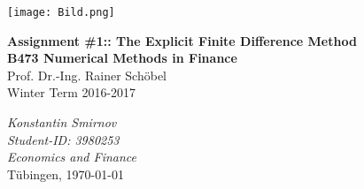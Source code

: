 \documentclass[a4paper,12pt]{article}
\begin{document}




\begin{titlepage}       %

\thispagestyle{empty}   %

\begin{center}
\texttt{[image: Bild.png]}
\end{center}

\begin{center}

\vspace*{1.5cm}
{\bf  \Large Assignment \#1:: The Explicit Finite Difference Method} \\
\vspace*{2cm} 
\textbf{B473 Numerical Methods in Finance}
\\
Prof. Dr.-Ing. Rainer Sch\"obel
\\
\vspace*{0.5cm} 
Winter Term 2016-2017\\
\end{center}

\vfill
\begin{flushright}
    \emph{Konstantin Smirnov}\\
    \textit{Student-ID: 3980253}\\
     \textit{ Economics and Finance}\\
 T\"ubingen, \today
  




\end{flushright}



% 
% 
% 

\end{titlepage}

\newpage                %

\listoffigures
\newpage
\end{document}

